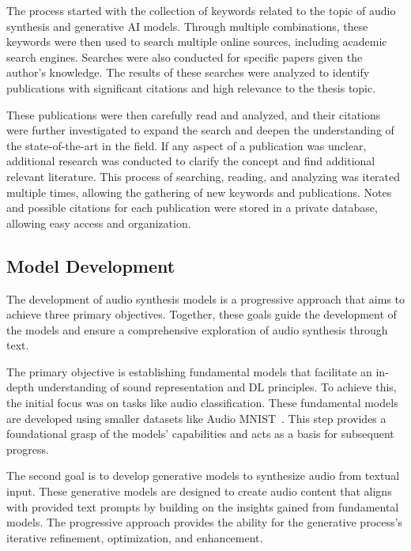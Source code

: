 The process started with the collection of keywords related to the topic of audio synthesis and generative \ac{AI} models. Through multiple combinations, these keywords were then used to search multiple online sources, including academic search engines. Searches were also conducted for specific papers given the author's knowledge. The results of these searches were analyzed to identify publications with significant citations and high relevance to the thesis topic.

These publications were then carefully read and analyzed, and their citations were further investigated to expand the search and deepen the understanding of the state-of-the-art in the field. If any aspect of a publication was unclear, additional research was conducted to clarify the concept and find additional relevant literature.
This process of searching, reading, and analyzing was iterated multiple times, allowing the gathering of new keywords and publications. Notes and possible citations for each publication were stored in a private database, allowing easy access and organization.

\subsection{Model Development} \label{sec:problem-model-development}

The development of audio synthesis models is a progressive approach that aims to achieve three primary objectives. Together, these goals guide the development of the models and ensure a comprehensive exploration of audio synthesis through text.

The primary objective is establishing fundamental models that facilitate an in-depth understanding of sound representation and \ac{DL} principles. To achieve this, the initial focus was on tasks like audio classification. These fundamental models are developed using smaller datasets like Audio MNIST~\cite{becker_interpreting_2018}. This step provides a foundational grasp of the models' capabilities and acts as a basis for subsequent progress.

The second goal is to develop generative models to synthesize audio from textual input. These generative models are designed to create audio content that aligns with provided text prompts by building on the insights gained from fundamental models. The progressive approach provides the ability for the generative process's iterative refinement, optimization, and enhancement.


